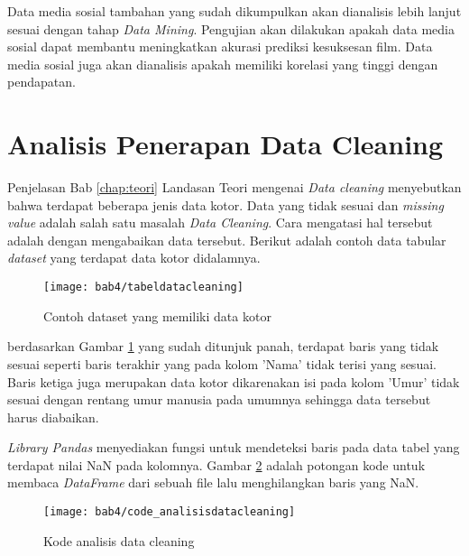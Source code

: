 Data media sosial tambahan yang sudah dikumpulkan akan dianalisis lebih lanjut sesuai dengan tahap \textit{Data Mining}. Pengujian  akan dilakukan apakah data media sosial dapat membantu meningkatkan akurasi prediksi kesuksesan film. Data media sosial juga akan dianalisis apakah memiliki korelasi yang tinggi dengan pendapatan. 

\section{Analisis Penerapan Data Cleaning}
Penjelasan Bab \ref{chap:teori} Landasan Teori mengenai \textit{Data cleaning} menyebutkan bahwa terdapat beberapa jenis data kotor. Data yang tidak sesuai dan \textit{missing value} adalah salah satu masalah \textit{Data Cleaning}. Cara mengatasi hal tersebut adalah dengan mengabaikan data tersebut. Berikut adalah contoh data tabular \textit{dataset} yang terdapat data kotor didalamnya.


\begin{figure}[H]
	\centering  
	\texttt{[image: bab4/tabeldatacleaning]}   
	\caption{Contoh dataset yang memiliki data kotor}
	\label{fig:tabeldatacleaning} 
\end{figure} 


berdasarkan Gambar \ref{fig:tabeldatacleaning} yang sudah ditunjuk panah, terdapat baris yang tidak sesuai seperti baris terakhir yang pada kolom 'Nama' tidak terisi yang sesuai. Baris ketiga juga merupakan data kotor dikarenakan isi pada kolom 'Umur' tidak sesuai dengan rentang umur manusia pada umumnya sehingga data tersebut harus diabaikan. 

\textit{Library Pandas} menyediakan fungsi untuk mendeteksi baris pada data tabel yang terdapat nilai NaN pada kolomnya. Gambar \ref{fig:code_analisisdatacleaning} adalah potongan kode untuk membaca \textit{DataFrame} dari sebuah file lalu menghilangkan baris yang NaN.
%
%
%


\begin{figure}[H]
	\centering  
	\texttt{[image: bab4/code\_analisisdatacleaning]}   
	\caption{Kode analisis data cleaning}
	\label{fig:code_analisisdatacleaning} 
\end{figure} 



